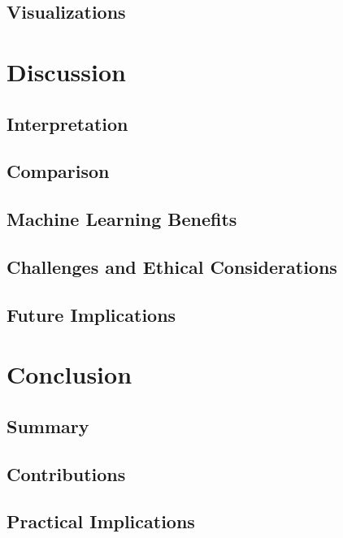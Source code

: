 \documentclass[draft,final]{thesisclass} %
\begin{document}
\section{Visualizations}
\lipsum[1]

\chapter{Discussion}

\section{Interpretation}
\lipsum[1]

\section{Comparison}
\lipsum[1]

\section{Machine Learning Benefits}
\lipsum[1]

\section{Challenges and Ethical Considerations}
\lipsum[1]

\section{Future Implications}
\lipsum[1]

\chapter{Conclusion}

\section{Summary}
\lipsum[1]

\section{Contributions}
\lipsum[1]

\section{Practical Implications}
\lipsum[1]
\end{document}
